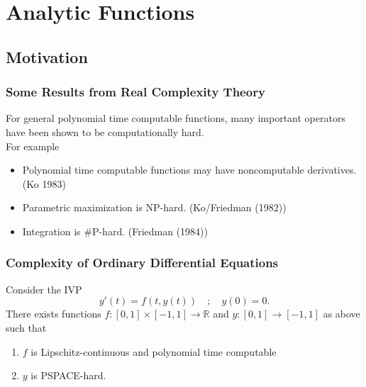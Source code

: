 \documentclass[xcolor=pdftex,dvipsnames,table]{beamer}
\newcommand{\RR}{\ensuremath{\mathbb{R}}}
\begin{document}
\section{Analytic Functions}
\subsection{Motivation}
\begin{frame}
\frametitle{Some Results from Real Complexity Theory}
  \begin{tcolorbox}[colback=yellow!5,title=Fact,colframe=blue!75!black]

For general polynomial time computable functions, many important operators have been shown to be computationally hard.\\
For example
\begin{itemize}[<+->]
\item Polynomial time computable functions may have noncomputable derivatives. (Ko 1983)
\item Parametric maximization is NP-hard. (Ko/Friedman (1982))
\item Integration is \#P-hard. (Friedman (1984))
\end{itemize}
\end{tcolorbox}
\end{frame}
\begin{frame}
\frametitle{Complexity of Ordinary Differential Equations}
\begin{theorem}[Kawamura, 2010]
Consider the IVP
$$
y'(t)=f(t,y(t)) \quad;\quad y(0)=0.
$$
There exists functions $f: [0,1] \times [-1,1] \to \RR$ and  $y: [0,1] \to [-1,1]$  as above such that
\begin{enumerate}
\item $f$ is Lipschitz-continuous and polynomial time computable
\item $y$ is PSPACE-hard.
\end{enumerate}
\end{theorem}
\end{frame}
\end{document}
